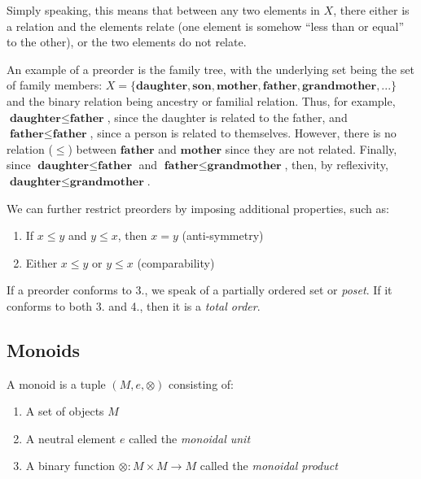 \documentclass[
]{book}
\providecommand{\tightlist}{%
  \setlength{\itemsep}{0pt}\setlength{\parskip}{0pt}}
\theoremstyle{definition}
\theoremstyle{definition}
\theoremstyle{definition}
\theoremstyle{definition}
\theoremstyle{remark}
\begin{document}
Simply speaking, this means that between any two elements in \(X\), there either is a relation and the elements relate (one element is somehow ``less than or equal'' to the other), or the two elements do not relate.

An example of a preorder is the family tree, with the underlying set being the set of family members: \(X = \{  \textbf{daughter}, \textbf{son}, \textbf{mother}, \textbf{father}, \textbf{grandmother}, ... \}\) and the binary relation being ancestry or familial relation. Thus, for example, \(\textbf{daughter} \leq \textbf{father}\), since the daughter is related to the father, and \(\textbf{father} \leq \textbf{father}\), since a person is related to themselves. However, there is no relation (\(\leq\)) between \(\textbf{father}\) and \(\textbf{mother}\) since they are not related. Finally, since \(\textbf{daughter} \leq \textbf{father}\) and \(\textbf{father} \leq \textbf{grandmother}\), then, by reflexivity, \(\textbf{daughter} \leq \textbf{grandmother}\).

We can further restrict preorders by imposing additional properties, such as:

\begin{enumerate}
\def\labelenumi{\arabic{enumi}.}
\setcounter{enumi}{2}
\tightlist
\item
  If \(x \leq y\) and \(y \leq x\), then \(x = y\) (anti-symmetry)
\item
  Either \(x \leq y\) or \(y \leq x\) (comparability)
\end{enumerate}

If a preorder conforms to 3., we speak of a partially ordered set or \emph{poset}. If it conforms to both 3. and 4., then it is a \emph{total order}.

\subsection{Monoids}\label{monoids}

A monoid is a tuple \((M, e, \otimes)\) consisting of:

\begin{enumerate}
\def\labelenumi{\alph{enumi}.}
\tightlist
\item
  A set of objects \(M\)
\item
  A neutral element \(e\) called the \emph{monoidal unit}
\item
  A binary function \(\otimes: M \times M \to M\) called the \emph{monoidal product}
\end{enumerate}
\end{document}
